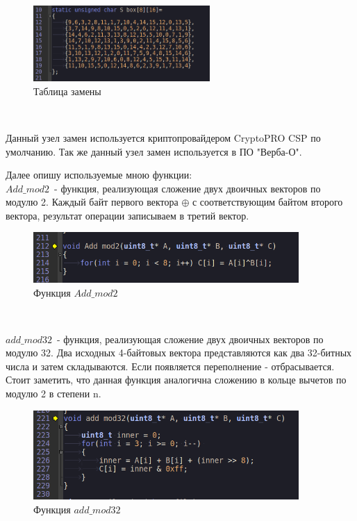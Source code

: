 \documentclass[oneside,final,14pt]{extreport}
\begin{document}
\begin{figure}[h!]
\includegraphics[width=0.6\textwidth]{9.png}
\caption{Таблица замены}
\end{figure}




~\



Данный узел замен используется криптопровайдером CryptoPRO CSP по умолчанию. Так же данный узел замен используется в ПО "Верба-О".

Далее опишу используемые мною функции:\\

$Add\_mod2$~- функция, реализующая сложение двух двоичных векторов по модулю 2. Каждый байт первого вектора $\oplus$ с соответствующим байтом второго вектора, результат операции записываем в третий вектор.\\

\begin{figure}[h!]
\includegraphics[width=0.9\textwidth]{10.png}
\caption{Функция $Add\_mod2$}
\end{figure}




~\



$add\_mod32$~- функция, реализующая сложение двух двоичных векторов по модулю 32. Два исходных 4-байтовых вектора представляются как два 32-битных числа и затем складываются. Если появляется переполнение - отбрасывается. \\

Стоит заметить, что данная функция аналогична сложению в кольце вычетов по модулю 2 в степени n.\\


\begin{figure}[hb!]
\includegraphics[width=0.9\textwidth]{11.png}
\caption{Функция $add\_mod32$}
\end{figure} \\
\end{document}
